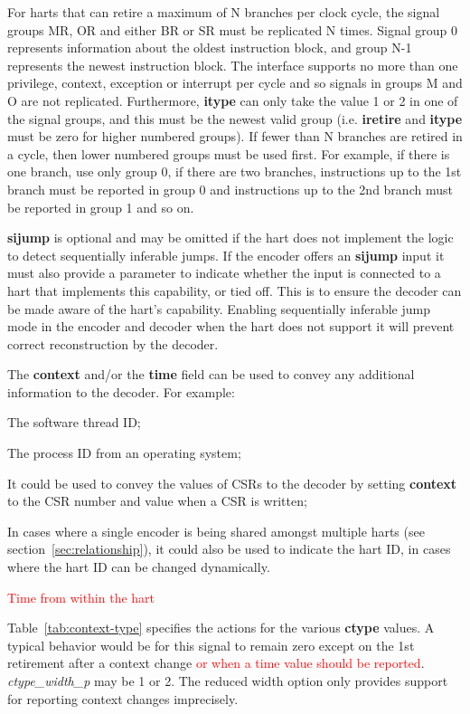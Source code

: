 For harts that can retire a maximum of N branches per clock
cycle, the signal groups MR, OR and either BR or SR must be replicated N times. 
Signal group 0 represents information about the oldest instruction block, and group N-1
represents the newest instruction block. The interface supports no more
than one privilege, context, exception or interrupt per cycle and so signals in
groups M and O are not replicated. Furthermore, \textbf{itype} can only
take the value 1 or 2 in one of the signal groups, and this must be
the newest valid group (i.e. \textbf{iretire} and \textbf{itype} must
be zero for higher numbered groups). If fewer than N branches
are retired in a cycle, then lower numbered groups must be used
first. For example, if there is one branch, use only group 0, if
there are two branches, instructions up to the 1st branch
must be reported in group 0 and instructions up to the 2nd branch
must be reported in group 1 and so on.

\textbf{sijump} is optional and may be omitted if the hart does not implement the logic to detect
sequentially inferable jumps.  If the encoder offers an \textbf{sijump} input it must also provide a
parameter to indicate whether the input is connected to a hart that implements this capability, or
tied off.  This is to ensure the decoder can be made aware of the hart's capability.  Enabling 
sequentially inferable jump mode in the encoder and decoder when the hart does not support it will
prevent correct reconstruction by the decoder. 

The \textbf{context} and/or the \textbf{time} field can be used to convey any additional information to the decoder.  For example:

\begin{itemize}
  \item The software thread ID;
  \item The process ID from an operating system;
  \item It could be used to convey the values of CSRs to the decoder by setting \textbf{context} to the 
    CSR number and value when a CSR is written;
  \item In cases where a single encoder is being shared amongst multiple harts 
  (see section~\ref{sec:relationship}), it could also be used to indicate the hart ID, in cases where the 
  hart ID can be changed dynamically.
\textcolor{red}{\item Time from within the hart}
\end{itemize}

Table~\ref{tab:context-type} specifies the actions for the various
\textbf{ctype} values.  A typical behavior would be for this signal to
remain zero except on the 1st retirement after a context change
\textcolor{red}{or when a time value should be reported}.
\textit{ctype\_width\_p} may be 1 or 2.  The reduced width option only
provides support for reporting context changes imprecisely.

